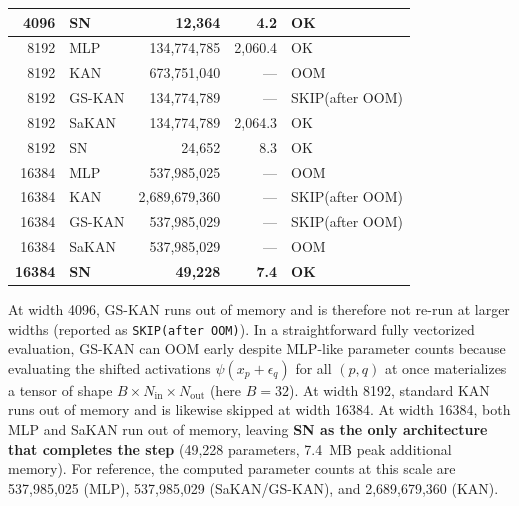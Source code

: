 \documentclass{article}
\theoremstyle{plain}
\theoremstyle{definition}
\theoremstyle{remark}
\begin{document}
\begin{table}[ht]
\begin{tabular}{r l r r l}
4096  & SN        & 12,364        & 4.2     & OK \\
\midrule
8192  & MLP       & 134,774,785   & 2,060.4 & OK \\
8192  & KAN       & 673,751,040   & ---     & OOM \\
8192  & GS-KAN    & 134,774,789   & ---     & SKIP(after OOM) \\
8192  & SaKAN     & 134,774,789   & 2,064.3 & OK \\
8192  & SN        & 24,652        & 8.3     & OK \\
\midrule
16384 & MLP       & 537,985,025   & ---     & OOM \\
16384 & KAN       & 2,689,679,360 & ---     & SKIP(after OOM) \\
16384 & GS-KAN    & 537,985,029   & ---     & SKIP(after OOM) \\
16384 & SaKAN     & 537,985,029   & ---     & OOM \\
\textbf{16384} & \textbf{SN} & \textbf{49,228} & \textbf{7.4} & \textbf{OK} \\
\bottomrule
\end{tabular}
\end{table}

At width 4096, GS-KAN runs out of memory and is therefore not re-run at larger widths (reported as \texttt{SKIP(after OOM)}). In a straightforward fully vectorized evaluation, GS-KAN can OOM early despite MLP-like parameter counts because evaluating the shifted activations $\psi(x_p+\epsilon_q)$ for all $(p,q)$ at once materializes a tensor of shape $B \times N_{\mathrm{in}} \times N_{\mathrm{out}}$ (here $B=32$). At width 8192, standard KAN runs out of memory and is likewise skipped at width 16384. At width 16384, both MLP and SaKAN run out of memory, leaving \textbf{SN as the only architecture that completes the step} (49,228 parameters, 7.4~MB peak additional memory). For reference, the computed parameter counts at this scale are 537,985,025 (MLP), 537,985,029 (SaKAN/GS-KAN), and 2,689,679,360 (KAN).
\end{document}
